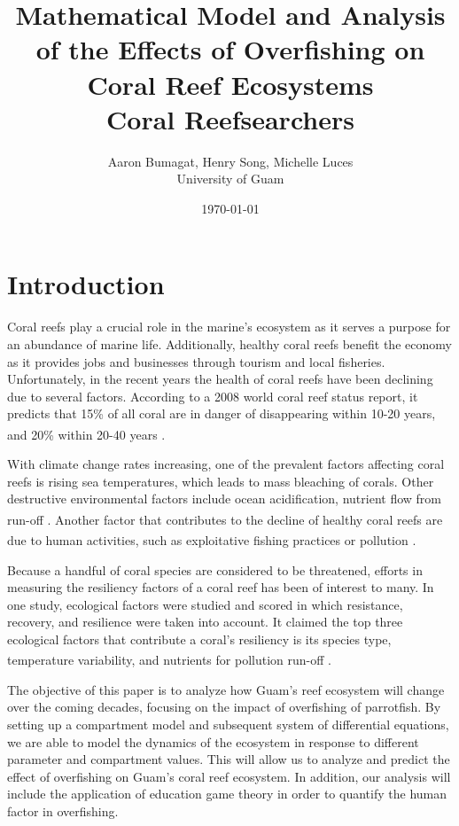 \documentclass[12pt]{article}
\title{Mathematical Model and Analysis of the Effects of Overfishing on Coral Reef Ecosystems\\\large{Coral Reefsearchers}}
\author{Aaron Bumagat, Henry Song, Michelle Luces\\University of Guam}
\date{\today}
\begin{document}
\maketitle
\section{Introduction}
Coral reefs play a crucial role in the marine's ecosystem as it serves a purpose for an abundance of marine life. Additionally, healthy coral reefs benefit the economy as it provides jobs and businesses through tourism and local fisheries. Unfortunately, in the recent years the health of coral reefs have been declining due to several factors. According to a 2008 world coral reef status report, it predicts that 15\% of all coral are in danger of disappearing within 10-20 years, and 20\% within 20-40 years \textsuperscript{\cite{05_quintero_machuca_cotto_bradley_ríos-soto_2016}}. 

With climate change rates increasing, one of the prevalent factors affecting coral reefs is rising sea temperatures, which leads to mass bleaching of corals. Other destructive environmental factors include ocean acidification, nutrient flow from run-off \textsuperscript{\cite{05_quintero_machuca_cotto_bradley_ríos-soto_2016}}. Another factor that contributes to the decline of healthy coral reefs are due to human activities, such as exploitative fishing practices or pollution \textsuperscript{\cite{04_mathanalysis}}. 

Because a handful of coral species are considered to be threatened, efforts in measuring the resiliency factors of a coral reef has been of interest to many. In one study, ecological factors were studied and scored in which resistance, recovery, and resilience were taken into account. It claimed the top three ecological factors that contribute a coral's resiliency is its species type, temperature variability, and nutrients for pollution run-off \textsuperscript{\cite{02_Riegl_Purkis_Model}}. 

The objective of this paper is to analyze how Guam's reef ecosystem will change over the coming decades, focusing on the impact of overfishing of parrotfish. By setting up a compartment model and subsequent system of differential equations, we are able to model the dynamics of the ecosystem in response to different parameter and compartment values. This will allow us to analyze and predict the effect of overfishing on Guam's coral reef ecosystem. In addition, our analysis will include the application of education game theory in order to quantify the human factor in overfishing.
\end{document}
